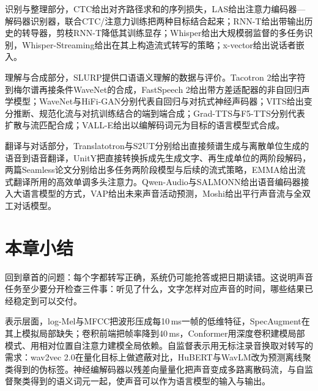 识别与整理部分，CTC给出对齐路径求和的序列损失\cite{nlp-speech-graves2006}，LAS给出注意力编码器—解码器识别器\cite{nlp-speech-chan2015}，联合CTC/注意力训练把两种目标结合起来\cite{nlp-speech-kim2017}；RNN-T给出带输出历史的转导器\cite{nlp-speech-graves2012}，剪枝RNN-T降低其训练显存\cite{nlp-speech-kuang2022}；Whisper给出大规模弱监督的多任务识别\cite{radford2023whisper}，Whisper-Streaming给出在其上构造流式转写的策略\cite{nlp-speech-machacek2023}；x-vector给出说话者嵌入\cite{nlp-speech-snyder2018}。

理解与合成部分，SLURP提供口语语义理解的数据与评价\cite{nlp-speech-bastianelli2020}。Tacotron 2给出字符到梅尔谱再接条件WaveNet的合成\cite{nlp-intro-shen2018}，FastSpeech 2给出带方差适配器的非自回归声学模型\cite{nlp-speech-ren2021}；WaveNet与HiFi-GAN分别代表自回归与对抗式神经声码器\cite{nlp-speech-oord2016wavenet,nlp-speech-kong2020}；VITS给出变分推断、规范化流与对抗训练结合的端到端合成\cite{nlp-speech-kim2021vits}；Grad-TTS与F5-TTS分别代表扩散与流匹配合成\cite{nlp-speech-popov2021gradtts,nlp-speech-chen2024f5tts}；VALL-E给出以编解码词元为目标的语言模型式合成\cite{nlp-speech-wang2023valle}。

翻译与对话部分，Translatotron与S2UT分别给出直接频谱生成与离散单位生成的语音到语音翻译\cite{nlp-speech-jia2019translatotron,nlp-speech-lee2022s2ut}，UnitY把直接转换拆成先生成文字、再生成单位的两阶段解码\cite{nlp-speech-inaguma2023unity}，两篇Seamless论文分别给出多任务两阶段模型与后续的流式策略\cite{nlp-intro-seamless2023,nlp-speech-seamless2023streaming}，EMMA给出流式翻译所用的高效单调多头注意力\cite{nlp-speech-ma2023emma}。Qwen-Audio与SALMONN给出语音编码器接入大语言模型的方式\cite{nlp-speech-chu2023qwenaudio,nlp-speech-tang2024salmonn}，VAP给出未来声音活动预测\cite{nlp-speech-ekstedt2022vap}，Moshi给出平行声音流与全双工对话模型\cite{defossez2024moshi}。

\section{本章小结}
\label{sec:nlp-speech-summary}

回到章首的问题：每个字都转写正确，系统仍可能抢答或把日期读错。这说明声音任务至少要分开检查三件事：听见了什么，文字怎样对应声音的时间，哪些结果已经稳定到可以交付。

表示层面，log-Mel与MFCC把波形压成每10\,ms一帧的低维特征，SpecAugment在其上模拟局部缺失；卷积前端把帧率降到40\,ms，Conformer用深度卷积建模局部模式、用相对位置自注意力建模全局依赖。自监督表示用无标注录音换取对转写的需求：wav2vec 2.0在量化目标上做遮蔽对比，HuBERT与WavLM改为预测离线聚类得到的伪标签。神经编解码器以残差向量量化把声音变成多路离散码流，与自监督聚类得到的语义词元一起，使声音可以作为语言模型的输入与输出。

